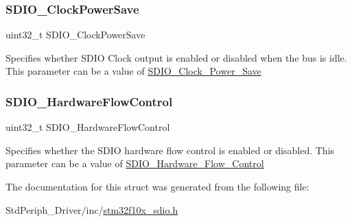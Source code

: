 \subsubsection{\texorpdfstring{SDIO\_ClockPowerSave}{SDIO\_ClockPowerSave}}
{\footnotesize\ttfamily uint32\+\_\+t S\+D\+I\+O\+\_\+\+Clock\+Power\+Save}

Specifies whether S\+D\+IO Clock output is enabled or disabled when the bus is idle. This parameter can be a value of \mbox{\hyperlink{group___s_d_i_o___clock___power___save}{S\+D\+I\+O\+\_\+\+Clock\+\_\+\+Power\+\_\+\+Save}} \mbox{\label{struct_s_d_i_o___init_type_def_a2acacb64a58fbff9d7a31e6e0c0a3d2e}} 
\subsubsection{\texorpdfstring{SDIO\_HardwareFlowControl}{SDIO\_HardwareFlowControl}}
{\footnotesize\ttfamily uint32\+\_\+t S\+D\+I\+O\+\_\+\+Hardware\+Flow\+Control}

Specifies whether the S\+D\+IO hardware flow control is enabled or disabled. This parameter can be a value of \mbox{\hyperlink{group___s_d_i_o___hardware___flow___control}{S\+D\+I\+O\+\_\+\+Hardware\+\_\+\+Flow\+\_\+\+Control}} 

The documentation for this struct was generated from the following file\+:\begin{DoxyCompactItemize}
\item 
Std\+Periph\+\_\+\+Driver/inc/\mbox{\hyperlink{stm32f10x__sdio_8h}{stm32f10x\+\_\+sdio.\+h}}\end{DoxyCompactItemize}
